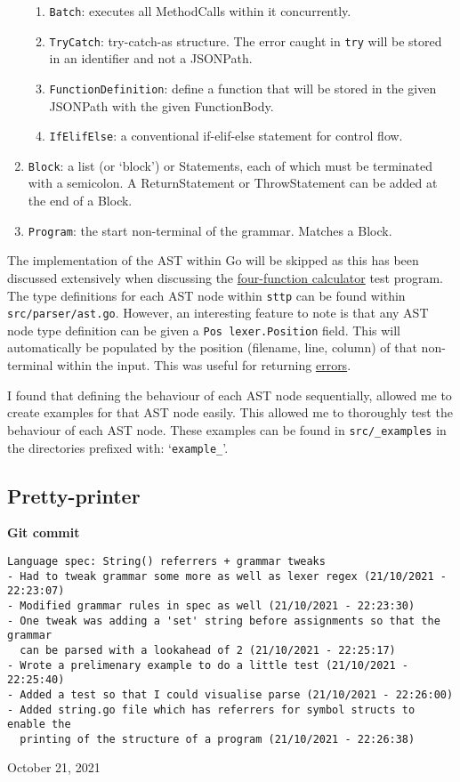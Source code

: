 \begin{enumerate}
\begin{enumerate}
        \item \verb|Batch|: executes all MethodCalls within it concurrently.
        \item \verb|TryCatch|: try-catch-as structure. The error caught in \verb|try| will be stored in an identifier and not a JSONPath.
        \item \verb|FunctionDefinition|: define a function that will be stored in the given JSONPath with the given FunctionBody.
        \item \verb|IfElifElse|: a conventional if-elif-else statement for control flow.
    \end{enumerate}
    \item \verb|Block|: a list (or `block') or Statements, each of which must be terminated with a semicolon. A ReturnStatement or ThrowStatement can be added at the end of a Block.
    \item \verb|Program|: the start non-terminal of the grammar. Matches a Block.
\end{enumerate}

The implementation of the AST within Go will be skipped as this has been discussed extensively when discussing the \hyperref[sec:four-function-calc]{four-function calculator} test program. The type definitions for each AST node within \verb|sttp| can be found within \verb|src/parser/ast.go|. However, an interesting feature to note is that any AST node type definition can be given a \texttt{Pos lexer.Position} field. This will automatically be populated by the position (filename, line, column) of that non-terminal within the input. This was useful for returning \hyperref[sec:development-try-catch-throw-errors-context]{errors}.

I found that defining the behaviour of each AST node sequentially, allowed me to create examples for that AST node easily. This allowed me to thoroughly test the behaviour of each AST node. These examples can be found in \verb|src/_examples| in the directories prefixed with: `\verb|example_|'.

\subsection{Pretty-printer}

\begin{center}
    \textbf{Git commit}
    \begin{verbatim}
Language spec: String() referrers + grammar tweaks
- Had to tweak grammar some more as well as lexer regex (21/10/2021 - 22:23:07)
- Modified grammar rules in spec as well (21/10/2021 - 22:23:30)
- One tweak was adding a 'set' string before assignments so that the grammar
  can be parsed with a lookahead of 2 (21/10/2021 - 22:25:17)
- Wrote a prelimenary example to do a little test (21/10/2021 - 22:25:40)
- Added a test so that I could visualise parse (21/10/2021 - 22:26:00)
- Added string.go file which has referrers for symbol structs to enable the
  printing of the structure of a program (21/10/2021 - 22:26:38)
    \end{verbatim}
    \vspace{-1em}
    \tiny{October 21, 2021}
\end{center}

